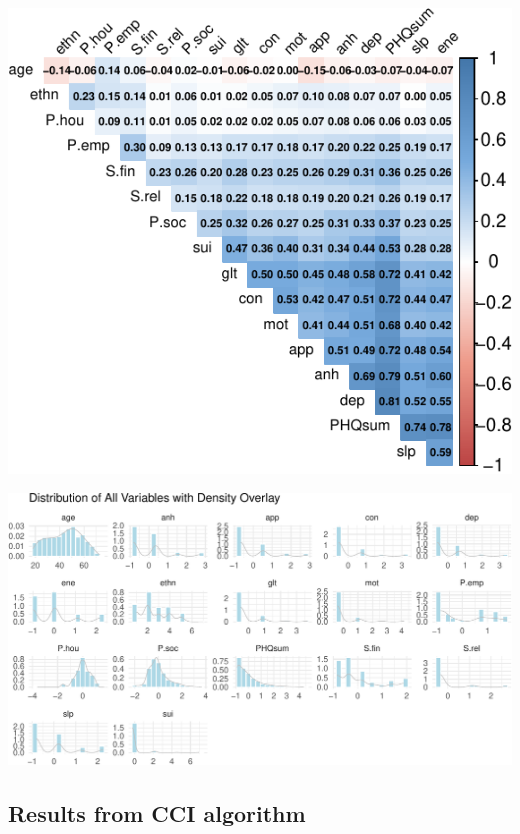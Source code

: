 \documentclass[
]{article}
\begin{document}
\begin{center}
\includegraphics{draft_v1_files/figure-pdf/unnamed-chunk-18-1.pdf}
\end{center}

\begin{center}
\includegraphics{draft_v1_files/figure-pdf/unnamed-chunk-19-1.pdf}
\end{center}

\subsection{Results from CCI
algorithm}\label{results-from-cci-algorithm}
\end{document}
